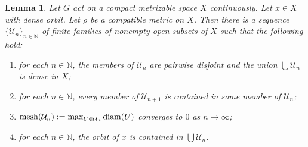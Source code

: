 \documentclass[11pt]{amsart}
\newtheorem{lemma}[theorem]{Lemma}
\theoremstyle{definition}
\numberwithin{equation}{section}
\theoremstyle{definition}
\newcommand{\cU}{{\mathcal U}}
\newcommand{\Nb}{{\mathbb N}}
\newcommand{\diam}{{\rm diam}}
\begin{document}
\begin{lemma} \label{L-avoid orbit}
Let $G$ act on a compact metrizable space $X$ continuously. Let $x\in X$ with dense orbit. Let $\rho$ be a compatible metric on $X$. Then there is a sequence $\{\cU_n\}_{n\in \Nb}$ of finite families of nonempty open subsets of $X$ such that the following hold:
\begin{enumerate}
\item[(a)] for each $n\in \Nb$, the members of $\cU_n$ are pairwise disjoint and the union $\bigcup \cU_n$ is dense in $X$;
\item[(b)] for each $n\in \Nb$, every member of $\cU_{n+1}$ is contained in some member of $\cU_n$;
\item[(c)] ${\rm mesh}(\cU_n):=\max_{U\in \cU_n}\diam(U)$ converges to $0$ as $n\to \infty$;
\item[(d)] for each $n\in \Nb$, the orbit of $x$ is contained in $\bigcup \cU_n$.
\end{enumerate}
\end{lemma}
\end{document}
